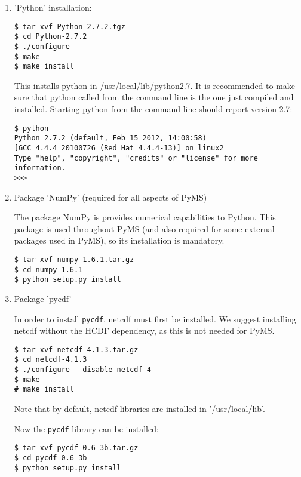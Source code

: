 \begin{enumerate}

\item 'Python' installation:

\begin{verbatim}
$ tar xvf Python-2.7.2.tgz
$ cd Python-2.7.2
$ ./configure
$ make
$ make install
\end{verbatim}

\noindent
This installs python in /usr/local/lib/python2.7. It is recommended
to make sure that python called from the command line is the one
just compiled and installed. Starting python from the command line
should report version 2.7:

\begin{verbatim}
$ python
Python 2.7.2 (default, Feb 15 2012, 14:00:58) 
[GCC 4.4.4 20100726 (Red Hat 4.4.4-13)] on linux2
Type "help", "copyright", "credits" or "license" for more information.
>>> 
\end{verbatim}

\item Package 'NumPy' (required for all aspects of PyMS)

The package NumPy is provides numerical capabilities to Python. This
package is used throughout PyMS (and also required for some external
packages used in PyMS), so its installation is mandatory.

\begin{verbatim}
$ tar xvf numpy-1.6.1.tar.gz
$ cd numpy-1.6.1
$ python setup.py install
\end{verbatim}

\item Package 'pycdf'

In order to install {\tt pycdf}, netcdf must first be installed. We
suggest installing netcdf without the HCDF dependency, as this is not
needed for PyMS.

\begin{verbatim}
$ tar xvf netcdf-4.1.3.tar.gz
$ cd netcdf-4.1.3
$ ./configure --disable-netcdf-4
$ make
# make install
\end{verbatim}

Note that by default, netcdf libraries are installed in '/usr/local/lib'.

Now the {\tt pycdf} library can be installed:

\begin{verbatim}
$ tar xvf pycdf-0.6-3b.tar.gz
$ cd pycdf-0.6-3b
$ python setup.py install
\end{verbatim}


\end{enumerate}
